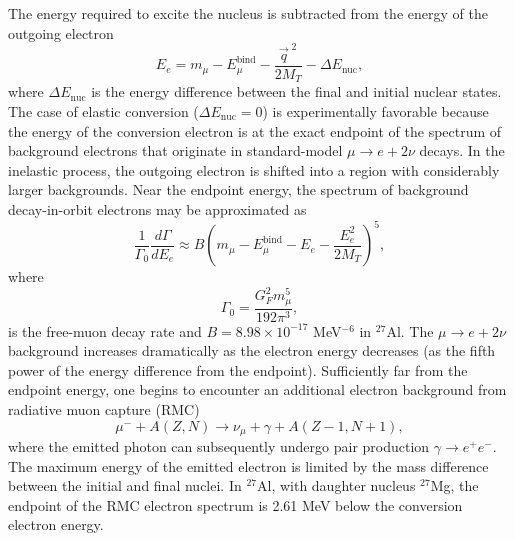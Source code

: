 \documentclass[12pt,letterpaper]{book}
\begin{document}
The energy required to excite the nucleus is subtracted from the energy of the outgoing electron
\begin{equation}
E_e=m_{\mu}-E^\mathrm{bind}_{\mu}-\frac{\vec{q}^{\;2}}{2M_T}-\Delta E_\mathrm{nuc}, 
\end{equation}
where $\Delta E_\mathrm{nuc}$ is the energy difference between the final and initial nuclear states. The case of elastic conversion ($\Delta E_\mathrm{nuc}=0$) is experimentally favorable because the energy of the conversion electron is at the exact endpoint of the spectrum of background electrons that originate in standard-model $\mu\rightarrow e+2\nu$ decays. In the inelastic process, the outgoing electron is shifted into a region with considerably larger backgrounds. Near the endpoint energy, the spectrum of background decay-in-orbit electrons may be approximated as \cite{Czarnecki:2011mx}
\begin{equation}
\frac{1}{\Gamma_0}\frac{d\Gamma}{dE_e}\approx B\left(m_{\mu}-E^\mathrm{bind}_{\mu}-E_e-\frac{E_e^2}{2M_T}\right)^5,
\end{equation}
where
\begin{equation}
\Gamma_0=\frac{G_F^2m_{\mu}^5}{192\pi^3},
\end{equation}
is the free-muon decay rate and $B=8.98\times 10^{-17}$ MeV$^{-6}$ in $^{27}$Al. The $\mu\rightarrow e+2\nu$ background increases dramatically as the electron energy decreases (as the fifth power of the energy difference from the endpoint). Sufficiently far from the endpoint energy, one begins to encounter an additional electron background from radiative muon capture (RMC)
\begin{equation}
\mu^-+A(Z,N)\rightarrow \nu_{\mu}+\gamma+A(Z-1,N+1),
\end{equation}
where the emitted photon can subsequently undergo pair production $\gamma\rightarrow e^+e^-$. The maximum energy of the emitted electron is limited by the mass difference between the initial and final nuclei. In $^{27}$Al, with daughter nucleus $^{27}$Mg, the endpoint of the RMC electron spectrum is 2.61 MeV below the conversion electron energy.
\end{document}
